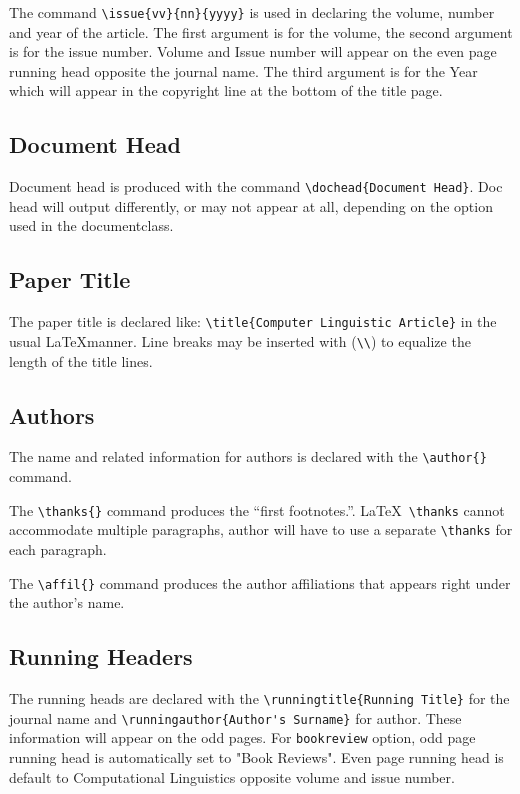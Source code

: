 \documentclass{clv3}
\begin{document}
The command \verb|\issue{vv}{nn}{yyyy}| is used in declaring the volume, number
and year of the article. The first argument is for the volume, the second argument 
is for the issue number. Volume and Issue number will appear on the even page 
running head opposite the journal name. The third argument is for the Year which 
will appear in the copyright line at the bottom of the title page.

\subsection{Document Head}

Document head is produced with the command \verb|\dochead{Document Head}|. Doc head 
will output differently, or may not appear at all, depending on the option used in the 
documentclass.

\subsection{Paper Title}

The paper title is declared like: \verb|\title{Computer Linguistic Article}|
in the usual \LaTeX manner. Line breaks may be inserted with (\verb|\\|) to equalize 
the length of the title lines.

\subsection{Authors}
The name and related information for authors is declared with the \verb|\author{}| command. 

The \verb|\thanks{}| command produces the ``first footnotes.''. \LaTeX\ \verb|\thanks| 
cannot accommodate multiple paragraphs, author will have to use a separate \verb|\thanks|
for each paragraph.

The \verb|\affil{}| command produces the author affiliations that appears right under 
the author's name.

\subsection{Running Headers}
The running heads are declared with the \verb|\runningtitle{Running Title}| for the 
journal name and \verb|\runningauthor{Author's Surname}| for author. These information 
will appear on the odd pages. For {\tt bookreview} option, odd page running head is 
automatically set to "Book Reviews". Even page running head is default to Computational 
Linguistics opposite volume and issue number.
\end{document}
